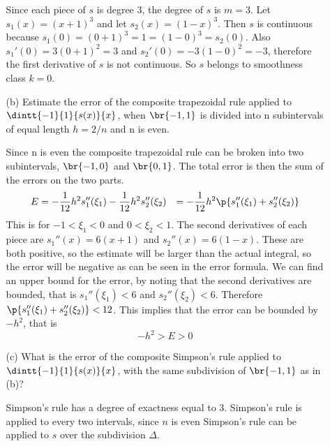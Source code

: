 \documentclass[11pt]{article}
\begin{document}
\begin{enumerate}
\begin{enumerate}
                Since each piece of $s$ is degree 3, the degree of $s$ is $m = 3$.
                Let $s_1(x) = (x + 1)^3$ and let $s_2(x) = (1-x)^3$.
                Then $s$ is continuous because $s_1(0) = (0 + 1)^3 = 1 = (1 - 0)^3
                = s_2(0)$.
                Also $s_1'(0) = 3(0 + 1)^2 = 3$ and $s_2'(0) = -3(1 - 0)^2 = -3$,
                therefore the first derivative of $s$ is not continuous.
                So $s$ belongs to smoothness class $k=0$.

            \item[(b)] %
                Estimate the error of the composite trapezoidal rule applied to 
                $\dintt{-1}{1}{s(x)}{x}$, when $\br{-1, 1}$ is divided into n
                subintervals of equal length $h = 2/n$ and n is even.

                Since n is even the composite trapezoidal rule can be broken
                into two subintervals, $\br{-1,0}$ and $\br{0,1}$.
                The total error is then the sum of the errors on the two parts.
                \begin{align*}
                    E &= -\frac{1}{12}h^2 s_1''(\xi_1) - \frac{1}{12} h^2 s_2''(\xi_2)
                    &= -\frac{1}{12} h^2 \p{s_1''(\xi_1) + s_2''(\xi_2)}
                \end{align*}
                This is for $-1 < \xi_1 < 0$ and $0 < \xi_2 < 1$.
                The second derivatives of each piece are $s_1''(x) = 6(x + 1)$
                and $s_2''(x) = 6(1 - x)$.
                These are both positive, so the estimate will be larger than
                the actual integral, so the error will be negative as can be
                seen in the error formula.
                We can find an upper bound for the error, by noting that the
                second derivatives are bounded, that is $s_1''(\xi_1) < 6$
                and $s_2''(\xi_2) < 6$.
                Therefore $\p{s_1''(\xi_1) + s_2''(\xi_2)} < 12$.
                This implies that the error can be bounded by $-h^2$, that is
                \[
                     -h^2 > E > 0
                \]

            \item[(c)] %
                What is the error of the composite Simpson’s rule applied to
                $\dintt{-1}{1}{s(x)}{x}$, with the same subdivision of
                $\br{-1, 1}$ as in (b)?

                Simpson's rule has a degree of exactness equal to 3.
                Simpson's rule is applied to every two intervals, since $n$ is
                even Simpson's rule can be applied to $s$ over the subdivision
                $\Delta$.


\end{enumerate}
\end{enumerate}
\end{document}
